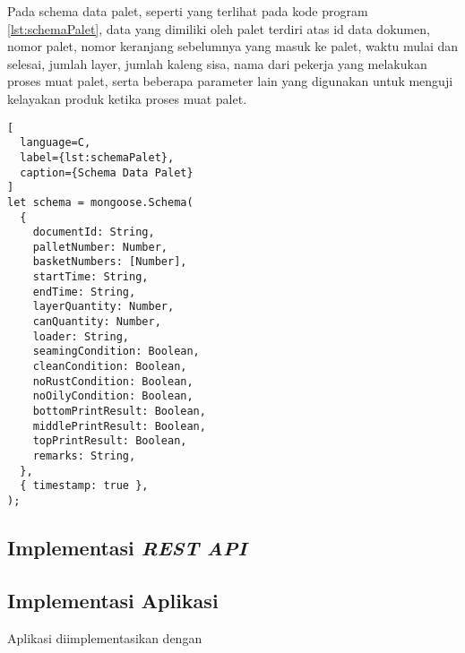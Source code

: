 Pada schema data palet, seperti yang terlihat pada kode program \ref{lst:schemaPalet}, data yang dimiliki oleh palet terdiri atas id data dokumen, nomor palet, nomor keranjang sebelumnya yang masuk ke palet, waktu mulai dan selesai, jumlah layer, jumlah kaleng sisa, nama dari pekerja yang melakukan proses muat palet, serta beberapa parameter lain yang digunakan untuk menguji kelayakan produk ketika proses muat palet.
\vspace{0.5ex}

\begin{lstlisting}[
  language=C,
  label={lst:schemaPalet},
  caption={Schema Data Palet}
]
let schema = mongoose.Schema(
  {
    documentId: String,
    palletNumber: Number,
    basketNumbers: [Number],
    startTime: String,
    endTime: String,
    layerQuantity: Number,
    canQuantity: Number,
    loader: String,
    seamingCondition: Boolean,
    cleanCondition: Boolean,
    noRustCondition: Boolean,
    noOilyCondition: Boolean,
    bottomPrintResult: Boolean,
    middlePrintResult: Boolean,
    topPrintResult: Boolean,
    remarks: String,
  },
  { timestamp: true },
);
\end{lstlisting}
\vspace{0.5ex}

\subsection{Implementasi \emph{REST API}}
\vspace{1ex}

\lipsum[4]
\vspace{0.5ex}

\subsection{Implementasi Aplikasi}
\vspace{1ex}

Aplikasi diimplementasikan dengan \lipsum[2]
\vspace{0.5ex}
